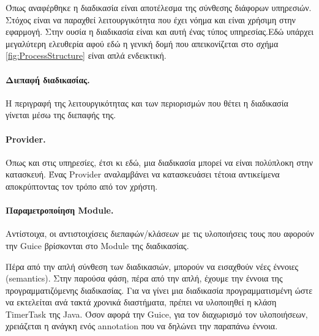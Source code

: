 Όπως αναφέρθηκε η διαδικασία είναι αποτέλεσμα της σύνθεσης 
διάφορων υπηρεσιών. Στόχος είναι να παραχθεί λειτουργικότητα που έχει 
νόημα και είναι χρήσιμη στην εφαρμογή. Στην ουσία η διαδικασία είναι και 
αυτή ένας τύπος υπηρεσίας.Εδώ υπάρχει μεγαλύτερη ελευθερία αφού 
εδώ η γενική δομή που απεικονίζεται στο σχήμα \ref{fig:ProcessStructure} 
είναι απλά ενδεικτική.

\paragraph{Διεπαφή διαδικασίας.} Η περιγραφή της λειτουργικότητας και των 
περιορισμών που θέτει η διαδικασία γίνεται μέσω της διεπαφής της.

\paragraph{Provider.} Όπως και στις υπηρεσίες, έτσι κι εδώ, μια διαδικασία 
μπορεί να είναι πολύπλοκη στην κατασκευή. Ένας Provider αναλαμβάνει να 
κατασκευάσει τέτοια αντικείμενα αποκρύπτοντας τον τρόπο από τον χρήστη.

\paragraph{Παραμετροποίηση Module.} Αντίστοιχα, οι αντιστοιχίσεις 
διεπαφών/κλάσεων με τις υλοποιήσεις τους που αφορούν την Guice 
βρίσκονται στο Module της διαδικασίας.

Πέρα από την απλή σύνθεση των διαδικασιών, μπορούν να εισαχθούν 
νέες έννοιες (semantics). Στην παρούσα φάση, πέρα από την απλή, έχουμε 
την έννοια της προγραμματιζόμενης διαδικασίας. Για να γίνει μια 
διαδικασία προγραμματισμένη ώστε να εκτελείται ανά τακτά χρονικά 
διαστήματα, πρέπει να υλοποιηθεί η κλάση TimerTask της Java. Όσον αφορά 
την Guice, για τον διαχωρισμό τον υλοποιήσεων, χρειάζεται η ανάγκη ενός 
annotation που να δηλώνει την παραπάνω έννοια.
